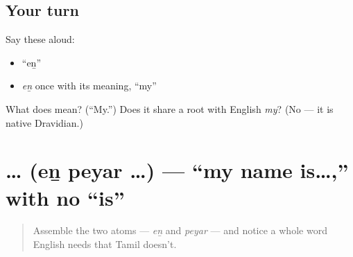 \subsection*{Your turn}
Say these aloud:

\begin{itemize}
\raggedright
  \item \textquotedblleft{}eṉ\textquotedblright{}
  \item \emph{eṉ} once with its meaning, \textquotedblleft{}my\textquotedblright{}
\end{itemize}

\begin{tcolorbox}[breakable,colback=teal!4,colframe=teal!35!black,title={Before you move on}]
What does \textbf{} mean? (\textquotedblleft{}My.\textquotedblright{}) Does it share a root with English \emph{my}? (No — it is native Dravidian.)
\end{tcolorbox}
\section[\texorpdfstring{\ta{என்} \ta{பெயர்} … (eṉ peyar …)}{என் பெயர் … (eṉ peyar …)}]{  … (eṉ peyar …) — \textquotedblleft{}my name is…,\textquotedblright{} with no \textquotedblleft{}is\textquotedblright{}}

\label{lesson:TA-C02-en-peyar}



\begin{quote}
Assemble the two atoms — \emph{eṉ} and \emph{peyar} — and notice a whole word English needs that Tamil doesn't.
\end{quote}

